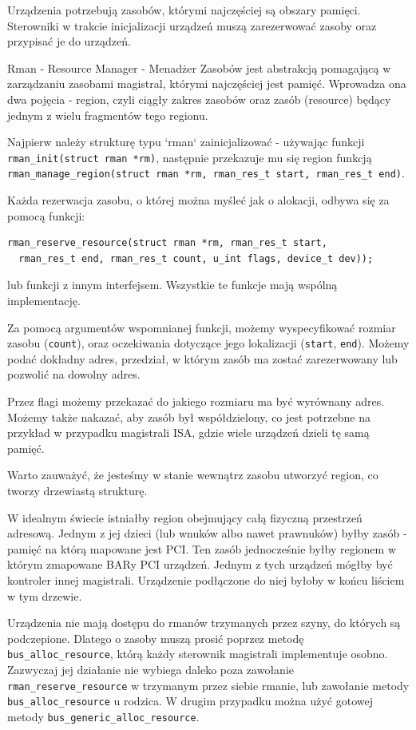 \documentclass[shortabstract,inz]{iithesis}
\begin{document}
Urządzenia potrzebują zasobów, którymi najczęściej są obszary pamięci. Sterowniki w 
trakcie inicjalizacji urządzeń muszą zarezerwować zasoby oraz przypisać je do urządzeń. 

Rman - Resource Manager - Menadżer Zasobów jest abstrakcją pomagającą w zarządzaniu zasobami magistral, 
którymi najczęściej jest pamięć. Wprowadza ona dwa pojęcia - region, czyli ciągły zakres zasobów oraz zasób 
(resource) będący jednym z wielu fragmentów tego regionu.

Najpierw należy strukturę typu `rman` zainicjalizować - używając funkcji \\
\texttt{rman\_init(struct rman *rm)}, 
następnie przekazuje mu się region funkcją \\
\texttt{rman\_manage\_region(struct rman *rm, rman\_res\_t start, rman\_res\_t end)}.

Każda rezerwacja zasobu, o 
której można myśleć jak o alokacji, odbywa się za pomocą funkcji:
\begin{lstlisting}
rman_reserve_resource(struct rman *rm, rman_res_t start, 
  rman_res_t end, rman_res_t count, u_int flags, device_t dev));
\end{lstlisting}
lub funkcji z innym interfejsem. Wszystkie te funkcje mają wspólną implementację.

Za pomocą argumentów wspomnianej funkcji, możemy wyspecyfikować rozmiar zasobu (\texttt{count}), oraz oczekiwania 
dotyczące jego lokalizacji (\texttt{start}, \texttt{end}). Możemy podać dokładny adres, przedział, w którym zasób ma zostać 
zarezerwowany lub pozwolić na dowolny adres. 

Przez flagi możemy przekazać do jakiego rozmiaru ma być wyrównany adres. Możemy także nakazać, aby zasób był 
współdzielony, co jest potrzebne na przykład w przypadku magistrali 
ISA, gdzie wiele urządzeń dzieli tę samą pamięć.

Warto zauważyć, że jesteśmy w stanie wewnątrz zasobu utworzyć region, co tworzy drzewiastą 
strukturę. 

W idealnym świecie istniałby region obejmujący całą fizyczną przestrzeń adresową. 
Jednym z jej dzieci (lub wnuków albo nawet prawnuków) byłby zasób - pamięć na którą 
mapowane jest PCI. Ten zasób jednocześnie byłby regionem w którym zmapowane BARy PCI urządzeń. 
Jednym z tych urządzeń mógłby być kontroler innej magistrali. Urządzenie podłączone do niej byłoby 
w końcu liściem w tym drzewie.



Urządzenia nie mają dostępu do rmanów trzymanych przez szyny, 
do których są podczepione. Dlatego o zasoby muszą prosić poprzez metodę \texttt{bus\_alloc\_resource}, 
którą każdy sterownik magistrali implementuje osobno. Zazwyczaj jej działanie nie wybiega 
daleko poza zawołanie \texttt{rman\_reserve\_resource} w trzymanym przez siebie rmanie, 
lub zawołanie metody \texttt{bus\_alloc\_resource} u rodzica. 
W drugim przypadku można użyć gotowej metody \texttt{bus\_generic\_alloc\_resource}.
\end{document}
